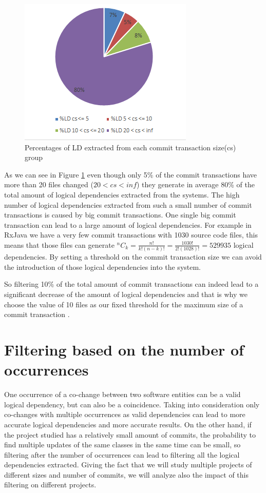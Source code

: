 \documentclass[12pt]{mitthesis}
\newcommand*{\Comb}[2]{{}^{#1}C_{#2}}%
\begin{document}
\begin{figure}[h]
\centering
\includegraphics[scale=0.9]{fig_ld_ts.png}
\caption{Percentages of LD extracted from each commit transaction size(cs) group}
\label{fig:fig_ld_ts}
\centering
\end{figure}

As we can see in Figure \ref{fig:fig_ld_ts} even though only 5\% of the commit transactions have more than 20 files changed ($20<cs<inf$) they generate in average 80\% of the total amount of logical dependencies extracted from the systems.
The high number of logical dependencies extracted from such a small number of commit transactions is caused by big commit transactions. 
One single big commit transaction can lead to a large amount of logical dependencies. For example in RxJava we have a very few commit transactions with 1030 source code files, this means that those files can generate 
$\Comb{n}{k}=\frac{n!}{k!(n-k)!} = \frac{1030!}{2!(1028)!} = 529 935$ logical dependencies. By setting a threshold on the commit transaction size we can avoid the introduction of those logical dependencies into the system.

So filtering 10\% of the total amount of commit transactions can indeed lead to a significant decrease of the amount of logical dependencies and that is why we choose the value of 10 files as our fixed threshold for the maximum size of a commit transaction \cite{DepSACI}.



\section{Filtering based on the number of occurrences}
One occurrence of a co-change between two software entities can be a valid logical dependency, but can also be a coincidence. Taking into consideration only co-changes with multiple occurrences as valid dependencies can lead to more accurate logical dependencies and more accurate results. On the other hand, if the project studied has a relatively small amount of commits, the probability to find multiple updates of the same classes in the same time can be small, so filtering after the number of occurrences can lead to filtering all the logical dependencies extracted. Giving the fact that we will study multiple projects of different sizes and number of commits, we will analyze also the impact of this filtering on different projects.
\end{document}
